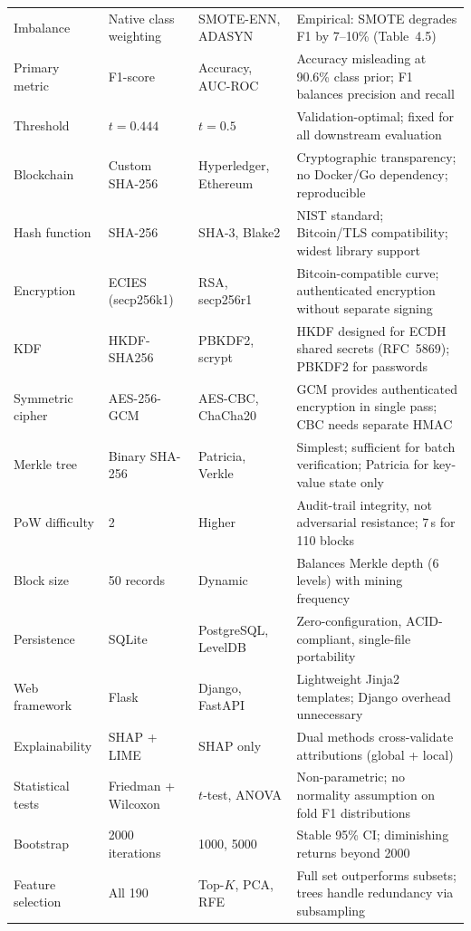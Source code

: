 \begin{longtable}{p{2.8cm} p{3cm} p{2.8cm} p{5cm}}
Imbalance & Native class weighting & SMOTE-ENN, ADASYN & Empirical: SMOTE degrades F1 by 7--10\% (Table~4.5) \\
Primary metric & F1-score & Accuracy, AUC-ROC & Accuracy misleading at 90.6\% class prior; F1 balances precision and recall \\
Threshold & $t = 0.444$ & $t = 0.5$ & Validation-optimal; fixed for all downstream evaluation \\
Blockchain & Custom SHA-256 & Hyperledger, Ethereum & Cryptographic transparency; no Docker/Go dependency; reproducible \\
Hash function & SHA-256 & SHA-3, Blake2 & NIST standard; Bitcoin/TLS compatibility; widest library support \\
Encryption & ECIES (secp256k1) & RSA, secp256r1 & Bitcoin-compatible curve; authenticated encryption without separate signing \\
KDF & HKDF-SHA256 & PBKDF2, scrypt & HKDF designed for ECDH shared secrets (RFC~5869); PBKDF2 for passwords \\
Symmetric cipher & AES-256-GCM & AES-CBC, ChaCha20 & GCM provides authenticated encryption in single pass; CBC needs separate HMAC \\
Merkle tree & Binary SHA-256 & Patricia, Verkle & Simplest; sufficient for batch verification; Patricia for key-value state only \\
PoW difficulty & 2 & Higher & Audit-trail integrity, not adversarial resistance; 7\,s for 110 blocks \\
Block size & 50 records & Dynamic & Balances Merkle depth (6 levels) with mining frequency \\
Persistence & SQLite & PostgreSQL, LevelDB & Zero-configuration, ACID-compliant, single-file portability \\
Web framework & Flask & Django, FastAPI & Lightweight Jinja2 templates; Django overhead unnecessary \\
Explainability & SHAP + LIME & SHAP only & Dual methods cross-validate attributions (global + local) \\
Statistical tests & Friedman + Wilcoxon & $t$-test, ANOVA & Non-parametric; no normality assumption on fold F1 distributions \\
Bootstrap & 2000 iterations & 1000, 5000 & Stable 95\% CI; diminishing returns beyond 2000 \\
Feature selection & All 190 & Top-$K$, PCA, RFE & Full set outperforms subsets; trees handle redundancy via subsampling \\
\end{longtable}

